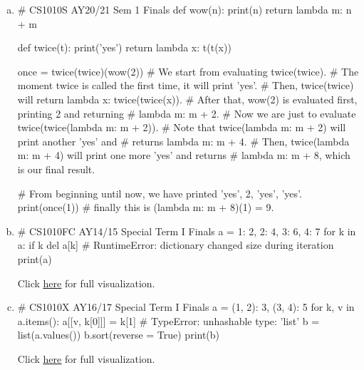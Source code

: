 \begin{enumerate}[(a)]
\item
\begin{python}
# CS1010S AY20/21 Sem 1 Finals
def wow(n):
    print(n)
    return lambda m: n + m

def twice(t):
    print('yes')
    return lambda x: t(t(x))

once = twice(twice)(wow(2))
# We start from evaluating twice(twice).
# The moment twice is called the first time, it will print 'yes'.
# Then, twice(twice) will return lambda x: twice(twice(x)).
# After that, wow(2) is evaluated first, printing 2 and returning
# lambda m: m + 2.
# Now we are just to evaluate twice(twice(lambda m: m + 2)).
# Note that twice(lambda m: m + 2) will print another 'yes' and
# returns lambda m: m + 4.
# Then, twice(lambda m: m + 4) will print one more 'yes' and returns
# lambda m: m + 8, which is our final result.

# From beginning until now, we have printed 'yes', 2, 'yes', 'yes'.
print(once(1)) # finally this is (lambda m: m + 8)(1) = 9.
\end{python}

\item
\begin{python}
# CS1010FC AY14/15 Special Term I Finals
a = {1: 2, 2: 4, 3: 6, 4: 7}
for k in a:
    if k %
        del a[k] # RuntimeError: dictionary changed size during iteration
print(a)
\end{python}
Click \href{https://pythontutor.com/visualize.html#code=a%20%3D%20%7B1%3A%202,%202%3A%204,%203%3A%206,%204%3A%207%7D%0Afor%20k%20in%20a%3A%0A%20%20%20%20if%20k%20%25%202%20%3D%3D%201%3A%0A%20%20%20%20%20%20%20%20del%20a%5Bk%5D%0Aprint%28a%29&cumulative=false&curInstr=0&heapPrimitives=nevernest&mode=display&origin=opt-frontend.js&py=3&rawInputLstJSON=%5B%5D&textReferences=false}{\underline{here}} for full visualization.

\item
\begin{python}
# CS1010X AY16/17 Special Term I Finals
a = {(1, 2): 3, (3, 4): 5}
for k, v in a.items():
    a[[v, k[0]]] = k[1] # TypeError: unhashable type: 'list'
b = list(a.values())
b.sort(reverse = True)
print(b)
\end{python}
Click \href{https://pythontutor.com/visualize.html#code=a%20%3D%20%7B%281,%202%29%3A%203,%20%283,%204%29%3A%205%7D%0Afor%20k,%20v%20in%20a.items%28%29%3A%0A%20%20%20%20a%5B%5Bv,%20k%5B0%5D%5D%5D%20%3D%20k%5B1%5D%0Ab%20%3D%20list%28a.values%28%29%29%0Ab.sort%28reverse%20%3D%20True%29%0Aprint%28b%29&cumulative=false&curInstr=0&heapPrimitives=nevernest&mode=display&origin=opt-frontend.js&py=3&rawInputLstJSON=%5B%5D&textReferences=false}{\underline{here}} for full visualization.


\end{enumerate}
